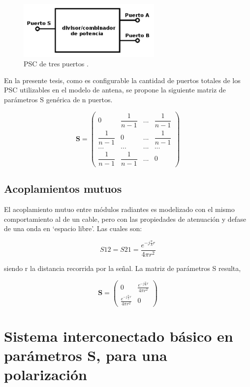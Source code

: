 \begin{figure}[H]
 \centering
 \includegraphics[width=7cm]{gfx/3PortsPSC.png}
 \caption{PSC de tres puertos \cite{MiniCircuits2015}.}
 \label{fig:3PortsPSC}
\end{figure}

En la presente tesis, como es configurable la cantidad de puertos totales de los PSC utilizables en el modelo de antena, se 
propone la siguiente matriz de parámetros S genérica de n puertos.

$$
\mathbf{S} = \begin{pmatrix} 0 & \dfrac{1}{n-1} & ... & \dfrac{1}{n-1}\\
							 \dfrac{1}{n-1} & 0 & ... & \dfrac{1}{n-1}\\
							 ... & ... & ... & ... \\
							 \dfrac{1}{n-1} & \dfrac{1}{n-1} & ... & 0 \end{pmatrix}
$$

\subsection{Acoplamientos mutuos}

El acoplamiento mutuo entre módulos radiantes es modelizado con el mismo comportamiento al de un cable, pero con las
propiedades de atenuación y defase de una onda en \enquote*{espacio libre}. Las cuales son:

\begin{equation}
	S12 = S21 = \dfrac{e^{-j\frac{\pi}{\lambda}r}}{4\pi r^2}
\end{equation}

siendo r la distancia recorrida por la señal. La matriz de parámetros S resulta,

$$
\mathbf{S} = \begin{pmatrix} 0 & \frac{e^{-j\frac{\pi}{\lambda}r}}{4\pi r^2}\\\frac{e^{-j\frac{\pi}{\lambda}r}}{4\pi r^2} & 0\end{pmatrix}
$$

\section{Sistema interconectado básico en parámetros S, para una polarización}

